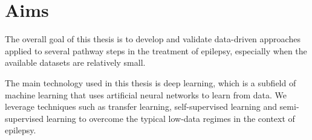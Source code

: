 \section{Aims}

The overall goal of this thesis is to develop and validate data-driven approaches applied to several pathway steps in the treatment of epilepsy, especially when the available datasets are relatively small.

The main technology used in this thesis is deep learning, which is a subfield of machine learning that uses artificial neural networks to learn from data.
We leverage techniques such as transfer learning, self-supervised learning and semi-supervised learning to overcome the typical low-data regimes in the context of epilepsy.

